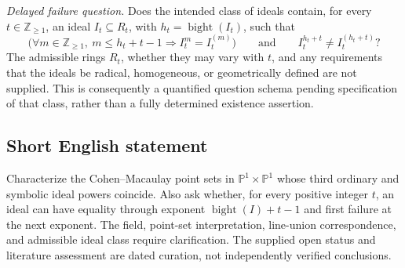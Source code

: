 \documentclass[11pt]{article}
\newcommand{\Z}{\mathbb{Z}}
\newcommand{\PP}{\mathbb{P}}
\begin{document}
\emph{Delayed failure question.} Does the intended class of ideals contain, for every \(t\in\Z_{\geq1}\), an ideal \(I_t\subseteq R_t\), with \(h_t=\operatorname{bight}(I_t)\), such that
\[
 \bigl(\forall m\in\Z_{\geq1},\ m\leq h_t+t-1
       \Longrightarrow I_t^m=I_t^{(m)}\bigr)
 \qquad\text{and}\qquad
 I_t^{h_t+t}\ne I_t^{(h_t+t)}?
\]
The admissible rings \(R_t\), whether they may vary with \(t\), and any requirements that the ideals be radical, homogeneous, or geometrically defined are not supplied. This is consequently a quantified question schema pending specification of that class, rather than a fully determined existence assertion.
\subsection{Short English statement}
Characterize the Cohen--Macaulay point sets in \(\PP^1\times\PP^1\) whose third ordinary and symbolic ideal powers coincide. Also ask whether, for every positive integer \(t\), an ideal can have equality through exponent \(\operatorname{bight}(I)+t-1\) and first failure at the next exponent. The field, point-set interpretation, line-union correspondence, and admissible ideal class require clarification. The supplied open status and literature assessment are dated curation, not independently verified conclusions.
\end{document}
